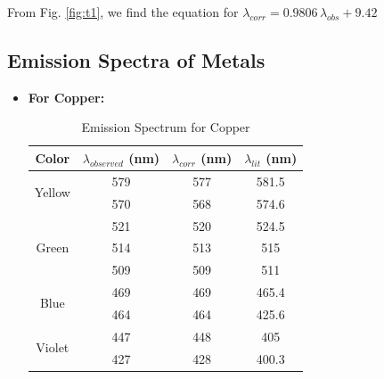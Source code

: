 From Fig. \ref{fig:t1}, we find the equation for $\lambda_{corr}=0.9806\,\lambda_{obs}+9.42$

\subsection*{Emission Spectra of Metals}

\begin{itemize}
    \item \textbf{For Copper:}
    \begin{table}[H]
        \centering
        \begin{tabular}{|c|c|c|c|}
            \hline
            Color                   & $\lambda_{observed}$   (nm) & $\lambda_{corr}$   (nm) & $\lambda_{lit}$   (nm) \\ \hline
            \multirow{2}{*}{Yellow} & 579                         & 577                     & 581.5                  \\ \cline{2-4} 
                                    & 570                         & 568                     & 574.6                  \\ \hline
            \multirow{3}{*}{Green}  & 521                         & 520                     & 524.5                  \\ \cline{2-4} 
                                    & 514                         & 513                     & 515                    \\ \cline{2-4} 
                                    & 509                         & 509                     & 511                    \\ \hline
            \multirow{2}{*}{Blue}   & 469                         & 469                     & 465.4                  \\ \cline{2-4} 
                                    & 464                         & 464                     & 425.6                  \\ \hline
            \multirow{2}{*}{Violet} & 447                         & 448                     & 405                    \\ \cline{2-4} 
                                    & 427                         & 428                     & 400.3                  \\ \hline
        \end{tabular}
        \caption{Emission Spectrum for Copper}
        \label{tab:copper}
    \end{table}
    

\end{itemize}
